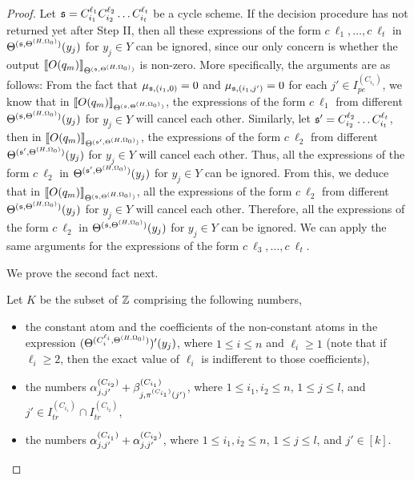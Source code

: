 \begin{appendix}
\begin{proof}
Let ${\mathfrak{s} }=C_{i_1}^{\ell_1} C_{i_2}^{\ell_2} \dots C_{i_t}^{\ell_t}$ be a cycle scheme. If the decision procedure has not returned yet after Step II, then all these expressions of the form $c\ \ell_1,\dots, c\ \ell_t$ in $\Theta^{({\mathfrak{s} }, \Theta^{(H,\Omega_0)})}(y_j)$ for $y_j \in Y$ can be ignored, since our only concern is whether the output $\llbracket O(q_m)\rrbracket_{\Theta^{({\mathfrak{s} }, \Theta^{(H,\Omega_0)})}}$ is non-zero. More specifically, the arguments are as follows: From the fact that  $\mu_{{\mathfrak{s} },(i_1,0)}=0$ and $\mu_{{\mathfrak{s} },(i_1,j')}=0$ for each $j' \in I^{(C_{i_1})}_{pe}$, we know that in $\llbracket O(q_m)\rrbracket_{\Theta^{({\mathfrak{s} }, \Theta^{(H,\Omega_0)})}}$, the  expressions of the form $c\ \ell_1$ from different $\Theta^{({\mathfrak{s} }, \Theta^{(H,\Omega_0)})}(y_j)$ for $y_j \in Y$ will cancel each other. Similarly, let ${\mathfrak{s} }' = C_{i_2}^{\ell_2} \dots C_{i_t}^{\ell_t}$, then in $\llbracket O(q_m)\rrbracket_{\Theta^{({\mathfrak{s} }', \Theta^{(H,\Omega_0)})}}$, the  expressions of the form $c\ \ell_2$ from different $\Theta^{({\mathfrak{s} }', \Theta^{(H,\Omega_0)})}(y_j)$ for $y_j \in Y$ will cancel each other. Thus, all the expressions of the form $c\ \ell_2$ in $\Theta^{({\mathfrak{s} }', \Theta^{(H,\Omega_0)})}(y_j)$ for $y_j \in Y$ can be ignored. From this, we deduce that in $\llbracket O(q_m)\rrbracket_{\Theta^{({\mathfrak{s} }, \Theta^{(H,\Omega_0)})}}$, all the expressions of the form $c\ \ell_2$ from different $\Theta^{({\mathfrak{s} }, \Theta^{(H,\Omega_0)})}(y_j)$ for $y_j \in Y$ will cancel each other. Therefore, all the expressions of the form $c\ \ell_2$ in $\Theta^{({\mathfrak{s} }, \Theta^{(H,\Omega_0)})}(y_j)$ for $y_j \in Y$ can be ignored. We can apply the same arguments for the expressions of the form $c\ \ell_3,\dots,c\ \ell_t$.

\medskip

We prove the second fact next. 

Let $K$ be the subset of ${\mathbb{Z} }$ comprising the following numbers,
\begin{itemize}
\item the constant atom and the coefficients of the non-constant atoms in the expression $(\Theta^{(C^{\ell_i}_{i}, \Theta^{(H,\Omega_0)})})'(y_j)$, where $1 \le i \le n$ and $\ell_i \ge 1$ (note that if $\ell_i \ge 2$, then the exact value of $\ell_i$ is indifferent to those coefficients),

%
\item  the numbers $\alpha^{(C_{i_2})}_{j,j'} + \beta^{(C_{i_1})}_{j,\pi^{(C_{i_1})}(j')}$, where $1 \le i_1,i_2 \le n$,  $1 \le j \le l$, and $j' \in I^{(C_{i_1})}_{tr} \cap I^{(C_{i_2})}_{tr}$,
%
\item  the numbers $\alpha^{(C_{i_1})}_{j, j'} + \alpha^{(C_{i_2})}_{j,j'}$, where $1 \le i_1,i_2 \le n$, $1 \le j \le l$, and $j' \in [k]$. 
\end{itemize}


\end{proof}
\end{appendix}
